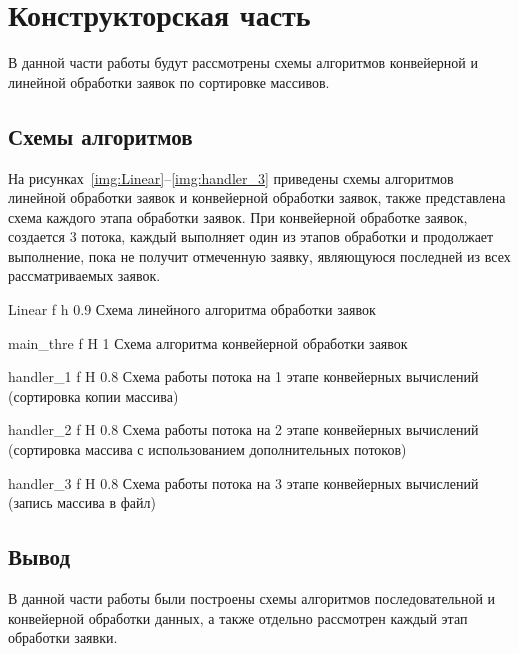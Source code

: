 \chapter{Конструкторская часть}
В данной части работы будут рассмотрены схемы алгоритмов конвейерной и линейной обработки заявок по сортировке массивов.







\section{Схемы алгоритмов}
На рисунках~\ref{img:Linear}--\ref{img:handler_3} приведены схемы алгоритмов линейной обработки заявок и конвейерной обработки заявок, также представлена схема
каждого этапа обработки заявок. При конвейерной обработке заявок, создается 3 потока, каждый выполняет один из этапов обработки и продолжает выполнение, пока не получит отмеченную заявку, являющуюся последней из всех рассматриваемых заявок.

{Linear} %
{f} %
{h} %
{0.9\textwidth} %
{Схема линейного алгоритма обработки заявок} %



{main_thre} %
{f} %
{H} %
{1\textwidth} %
{Схема алгоритма конвейерной обработки заявок} %


{handler_1} %
{f} %
{H} %
{0.8\textwidth} %
{Схема работы потока на 1 этапе конвейерных вычислений (сортировка копии массива)} %

{handler_2} %
{f} %
{H} %
{0.8\textwidth} %
{Схема работы потока на 2 этапе конвейерных вычислений (сортировка массива с использованием дополнительных потоков)} %

{handler_3} %
{f} %
{H} %
{0.8\textwidth} %
{Схема работы потока на 3 этапе конвейерных вычислений (запись массива в файл)} %






\section*{Вывод}
В данной части работы были построены схемы алгоритмов последовательной и конвейерной обработки данных, а также отдельно рассмотрен каждый этап обработки заявки.









